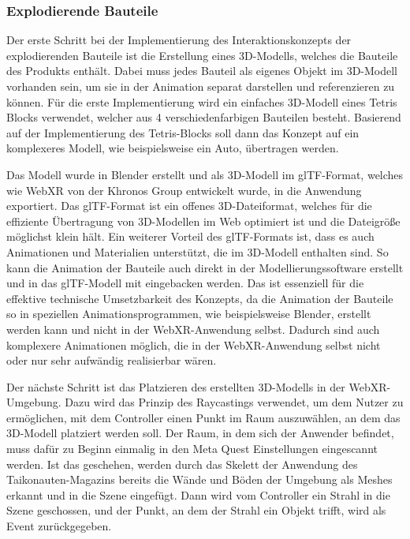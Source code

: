 \subsubsection{Explodierende Bauteile}

Der erste Schritt bei der Implementierung des Interaktionskonzepts der \glqq{}explodierenden\grqq{} Bauteile ist die Erstellung eines 3D-Modells, welches die Bauteile des Produkts enthält.
Dabei muss jedes Bauteil als eigenes Objekt im 3D-Modell vorhanden sein, um sie in der Animation separat darstellen und referenzieren zu können.
Für die erste Implementierung wird ein einfaches 3D-Modell eines Tetris Blocks verwendet, welcher aus 4 verschiedenfarbigen Bauteilen besteht.
Basierend auf der Implementierung des Tetris-Blocks soll dann das Konzept auf ein komplexeres Modell, wie beispielsweise ein Auto, übertragen werden.

Das Modell wurde in Blender erstellt und als 3D-Modell im glTF-Format, welches wie WebXR von der Khronos Group entwickelt wurde, in die Anwendung exportiert.
Das glTF-Format ist ein offenes 3D-Dateiformat, welches für die effiziente Übertragung von 3D-Modellen im Web optimiert ist und die Dateigröße möglichst klein hält.
Ein weiterer Vorteil des glTF-Formats ist, dass es auch Animationen und Materialien unterstützt, die im 3D-Modell enthalten sind.
So kann die Animation der Bauteile auch direkt in der Modellierungssoftware erstellt und in das glTF-Modell mit eingebacken werden.
Das ist essenziell für die effektive technische Umsetzbarkeit des Konzepts, da die Animation der Bauteile so in speziellen Animationsprogrammen, wie beispielsweise Blender, erstellt werden kann und nicht in der WebXR-Anwendung selbst.
Dadurch sind auch komplexere Animationen möglich, die in der WebXR-Anwendung selbst nicht oder nur sehr aufwändig realisierbar wären.

Der nächste Schritt ist das Platzieren des erstellten 3D-Modells in der WebXR-Umgebung.
Dazu wird das Prinzip des Raycastings verwendet, um dem Nutzer zu ermöglichen, mit dem Controller einen Punkt im Raum auszuwählen, an dem das 3D-Modell platziert werden soll.
Der Raum, in dem sich der Anwender befindet, muss dafür zu Beginn einmalig in den Meta Quest Einstellungen eingescannt werden.
Ist das geschehen, werden durch das Skelett der Anwendung des Taikonauten-Magazins bereits die Wände und Böden der Umgebung als Meshes erkannt und in die Szene eingefügt.
Dann wird vom Controller ein Strahl in die Szene geschossen, und der Punkt, an dem der Strahl ein Objekt trifft, wird als Event zurückgegeben.

